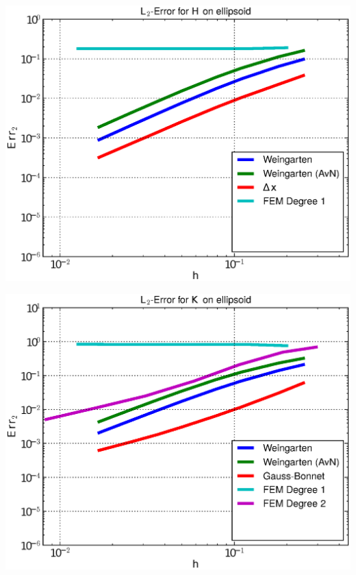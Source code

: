\documentclass[handout]{beamer}
\begin{document}
\begin{frame}
\begin{overprint}
\begin{minipage}[t]{0.49\textwidth}
            \centering\includegraphics[width=\textwidth]{bilder/Curvature/heineC/ErrHL2_4.eps}
          \end{minipage}
          \begin{minipage}[t]{0.49\textwidth}
            \centering\includegraphics[width=\textwidth]{bilder/Curvature/heineC/ErrKL2_5.eps}
          \end{minipage}\hfill
          \begin{minipage}[t]{0.49\textwidth}

\end{minipage}
\end{overprint}
\end{frame}
\end{document}
